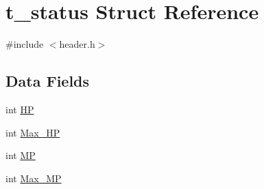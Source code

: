 \hypertarget{structt__status}{\section{t\-\_\-status Struct Reference}
\label{structt__status}
}


{\ttfamily \#include $<$header.\-h$>$}

\subsection*{Data Fields}
\begin{DoxyCompactItemize}
\item 
int \hyperlink{structt__status_a58ca25ca6c9448a364b84539e42f1fa6}{H\-P}
\item 
int \hyperlink{structt__status_a3ae8966f5c827b3c74072acda8de72af}{Max\-\_\-\-H\-P}
\item 
int \hyperlink{structt__status_a30fc75b90111fc791752dd1add6ed991}{M\-P}
\item 
int \hyperlink{structt__status_a5e48a681ff3d92aaa0e643fbc32ab2f7}{Max\-\_\-\-M\-P}
\end{DoxyCompactItemize}


